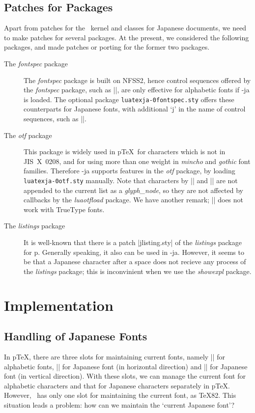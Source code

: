 \documentclass{ajt}
\begin{document}
\subsection{Patches for Packages}
Apart from patches for the \LaTeXe~kernel and classes for Japanese
documents, we need to make patches for several packages. At the present,
we considered the following packages, and made patches or porting for
the former two packages.

\begin{description}
\item[The \emph{fontspec} package] The \emph{fontspec} package is built
	   on NFSS2, hence control sequences offered by the
	   \emph{fontspec} package, such as |\setmainfont|, are only
	   effective for alphabetic fonts if \LuaTeX-ja is loaded. The
	   optional package \texttt{luatexja-\penalty0fontspec.sty}
	   offers these counterparts for Japanese fonts, with additional
	   `j' in the name of control sequences, such as
	   |\setmainjfont|.

\item[The \emph{otf} package]
This package is widely used in p\TeX\ for characters which is
not in JIS~X~0208, and for using more than one weight in \emph{mincho}
and \emph{gothic} font families. Therefore \LuaTeX-ja supports features
in the \emph{otf} package, by loading \texttt{luatexja-\penalty0otf.sty}
	   manually. Note that characters by || and
	   || are not appended to the current list as a
	   \emph{glyph\_node}, so they are not affected by callbacks by
	   the \emph{luaotfload} package. We have another remark; |\CID|
	   does not work with TrueType fonts.

\item[The \emph{listings} package]
It is well-known that there is a patch |jlisting.sty| of the
	   \emph{listings} package for p\LaTeXe. Generally speaking, it
	   also can be used in \LuaTeX-ja. However, it seems to be that
	   a Japanese character after a space does not recieve any
	   process of the \emph{listings} package; this is inconvinient
	   when we use the \emph{showexpl} package.
\end{description}



\section{Implementation}
\subsection{Handling of Japanese Fonts}
In p\TeX, there are three slots for maintaining current fonts, namely
|\font| for alphabetic fonts, |\jfont| for Japanese font (in horizontal
direction) and |\tfont| for Japanese font (in vertical direction). With
these slots, we can manage the current font for alphabetic characters
and that for Japanese characters separately in p\TeX.  However, \LuaTeX\
has only one slot for maintaining the current font, as \TeX82.  This
situation leads a problem: how can we maintain the `current Japanese
font'?
\end{document}
